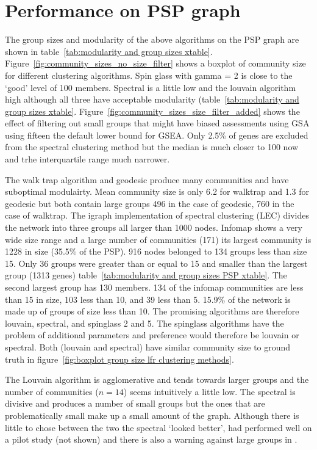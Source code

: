 \section{Performance on PSP graph}
\label{sec:Performance on PSP graph}
The group sizes and modularity of the above algorithms on the PSP graph are shown in table~\ref{tab:modularity and group sizes xtable}. Figure~\ref{fig:community_sizes_no_size_filter} shows a boxplot of community size for different clustering algorithms.  Spin glass with gamma = 2 is close to the `good' level of 100 members. Spectral is a little low and the louvain algorithm high although all three have acceptable modularity (table~\ref{tab:modularity and group sizes xtable}. Figure~\ref{fig:community_sizes_size_filter_added} shows the effect of filtering out small groups that might have biased assessments using GSA\cite{de2016statistical} using fifteen the default lower bound for GSEA. Only 2.5\% of genes are excluded from the spectral clustering method but the median is much closer to 100 now and trhe interquartile range much narrower. 


The walk trap algorithm and geodesic produce many communities and have suboptimal modulairty. Mean community size is only 6.2 for walktrap and 1.3 for geodesic but both contain large groups 496 in the case of geodesic, 760 in the case of walktrap. The igraph implementation of spectral clustering (LEC) divides the network into three groups all larger than 1000 nodes. Infomap shows a very wide size range and a large number of communities (171) its largest community is 1228 in size (35.5\% of the PSP). 916 nodes belonged to 134 groups less than size 15. Only 36 groups were greater than or equal to 15 and smaller than the largest group (1313 genes) table~\ref{tab:modularity and group sizes PSP xtable}. The second largest group has 130 members.  134 of the infomap communities are less than 15 in size, 103 less than 10, and 39 less than 5. 15.9\% of the network is made up of groups of size less than 10. The promising algorithms are therefore louvain, spectral, and spinglass 2 and 5. The spinglass algorithms have the problem of additional parameters and preference would therefore be louvain or spectral. Both (louvain and spectral) have similar community size to ground truth in figure~\ref{fig:boxplot group size lfr clustering methods}. 

The Louvain algorithm is agglomerative and tends towards larger groups and the number of communities ($n=14$) seems intuitively a little low. The spectral is divisive and produces a number of small groups but the ones that are problematically small make up a small amount of the graph. Although there is little to chose between the two the spectral `looked better', had performed well on a pilot study (not shown) and there is also a warning against large groups in \cite{de2016statistical}.



